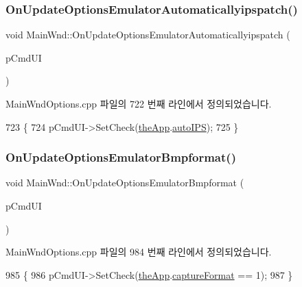 \subsubsection{\texorpdfstring{On\+Update\+Options\+Emulator\+Automaticallyipspatch()}{OnUpdateOptionsEmulatorAutomaticallyipspatch()}}
{\footnotesize\ttfamily void Main\+Wnd\+::\+On\+Update\+Options\+Emulator\+Automaticallyipspatch (\begin{DoxyParamCaption}\item[{C\+Cmd\+UI $\ast$}]{p\+Cmd\+UI }\end{DoxyParamCaption})\hspace{0.3cm}{\ttfamily [protected]}}



Main\+Wnd\+Options.\+cpp 파일의 722 번째 라인에서 정의되었습니다.


\begin{DoxyCode}
723 \{
724   pCmdUI->SetCheck(\mbox{\hyperlink{_v_b_a_8cpp_a8095a9d06b37a7efe3723f3218ad8fb3}{theApp}}.\mbox{\hyperlink{class_v_b_a_a7655aea2f21bde8159a666f977c30975}{autoIPS}});
725 \}
\end{DoxyCode}
\mbox{\label{class_main_wnd_a2db751ffefb04f3b4d337e29f6d1da7d}} 
\subsubsection{\texorpdfstring{On\+Update\+Options\+Emulator\+Bmpformat()}{OnUpdateOptionsEmulatorBmpformat()}}
{\footnotesize\ttfamily void Main\+Wnd\+::\+On\+Update\+Options\+Emulator\+Bmpformat (\begin{DoxyParamCaption}\item[{C\+Cmd\+UI $\ast$}]{p\+Cmd\+UI }\end{DoxyParamCaption})\hspace{0.3cm}{\ttfamily [protected]}}



Main\+Wnd\+Options.\+cpp 파일의 984 번째 라인에서 정의되었습니다.


\begin{DoxyCode}
985 \{
986   pCmdUI->SetCheck(\mbox{\hyperlink{_v_b_a_8cpp_a8095a9d06b37a7efe3723f3218ad8fb3}{theApp}}.\mbox{\hyperlink{class_v_b_a_a103f0b25433c57c4458a208a06799cf8}{captureFormat}} == 1);
987 \}
\end{DoxyCode}
\mbox{\label{class_main_wnd_a21587f86709a0f12079e3eb7b51c60dd}} 
